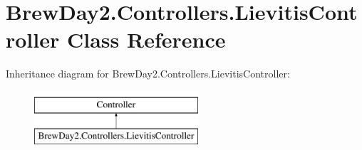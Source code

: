 \hypertarget{class_brew_day2_1_1_controllers_1_1_lievitis_controller}{}\section{Brew\+Day2.\+Controllers.\+Lievitis\+Controller Class Reference}
\label{class_brew_day2_1_1_controllers_1_1_lievitis_controller}
Inheritance diagram for Brew\+Day2.\+Controllers.\+Lievitis\+Controller\+:\begin{figure}[H]
\begin{center}
\leavevmode
\includegraphics[height=2.000000cm]{class_brew_day2_1_1_controllers_1_1_lievitis_controller}
\end{center}
\end{figure}
